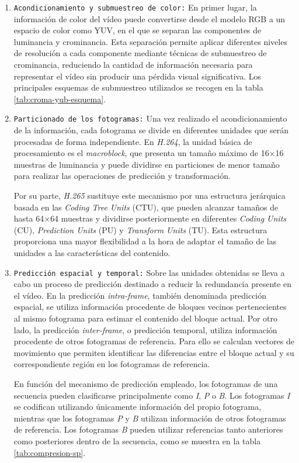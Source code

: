  \begin{enumerate} 
  \item \texttt{Acondicionamiento y submuestreo de color:} 
  En primer lugar, la información de color del vídeo puede convertirse desde el modelo RGB a un espacio de color como YUV, en el que se separan las componentes de luminancia y crominancia. Esta separación permite aplicar diferentes niveles de resolución a cada componente mediante técnicas de submuestreo de crominancia, reduciendo la cantidad de información necesaria para representar el vídeo sin producir una pérdida visual significativa. Los principales esquemas de submuestreo utilizados se recogen en la tabla \ref{tab:croma-yub-esquema}.
 
  \item \texttt{Particionado de los fotogramas:} 
  Una vez realizado el acondicionamiento de la información, cada fotograma se divide en diferentes unidades que serán procesadas de forma independiente. En \textit{H.264}, la unidad básica de procesamiento es el \textit{macroblock}, que presenta un tamaño máximo de 16$\times$16 muestras de luminancia y puede dividirse en particiones de menor tamaño para realizar las operaciones de predicción y transformación.

  Por su parte, \textit{H.265} sustituye este mecanismo por una estructura jerárquica basada en las \textit{Coding Tree Units} (CTU), que pueden alcanzar tamaños de hasta 64$\times$64 muestras y dividirse posteriormente en diferentes \textit{Coding Units} (CU), \textit{Prediction Units} (PU) y \textit{Transform Units} (TU). Esta estructura proporciona una mayor flexibilidad a la hora de adaptar el tamaño de las unidades a las características del contenido.
 
  \item \texttt{Predicción espacial y temporal:} 
  Sobre las unidades obtenidas se lleva a cabo un proceso de predicción destinado a reducir la redundancia presente en el vídeo. En la predicción \textit{intra-frame}, también denominada predicción espacial, se utiliza información procedente de bloques vecinos pertenecientes al mismo fotograma para estimar el contenido del bloque actual. Por otro lado, la predicción \textit{inter-frame}, o predicción temporal, utiliza información procedente de otros fotogramas de referencia. Para ello se calculan vectores de movimiento que permiten identificar las diferencias entre el bloque actual y su correspondiente región en los fotogramas de referencia.
 
  En función del mecanismo de predicción empleado, los fotogramas de una secuencia pueden clasificarse principalmente como \textit{I}, \textit{P} o \textit{B}. Los fotogramas \textit{I} se codifican utilizando únicamente información del propio fotograma, mientras que los fotogramas \textit{P} y \textit{B} utilizan información de otros fotogramas de referencia. Los fotogramas \textit{B} pueden utilizar referencias tanto anteriores como posteriores dentro de la secuencia, como se muestra en la tabla  \ref{tab:compresion-sp}.
 

\end{enumerate}
